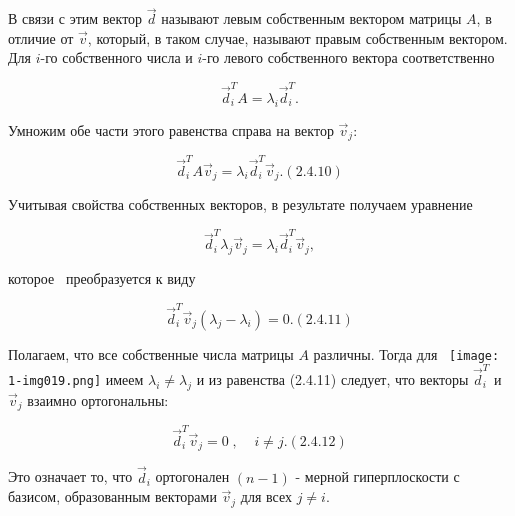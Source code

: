 		В связи с этим вектор  $\vec d$ называют левым собственным вектором матрицы  $A$, в отличие от  $\vec v$, который, в
		таком случае, называют правым собственным вектором. Для  $i$-го собственного числа и  $i$-го левого собственного
		вектора соответственно



		\begin{equation*}\label{key}
		\vec d_i^TA=\lambda _i\vec d_i^T.
		\end{equation*}



		Умножим обе части этого равенства справа на вектор  $\vec v_j$:



		\begin{equation}\label{key}
		\vec d_i^TA\vec v_j=\lambda _i\vec d_i^T\vec v_j.  (2.4.10)
		\end{equation}



		Учитывая свойства собственных векторов, в результате получаем уравнение



	\begin{equation*}\label{key}
	\vec d_i^T\lambda _j\vec v_j=\lambda _i\vec d_i^T\vec v_j,
	\end{equation*}



		которое \ преобразуется к виду



		\begin{equation}\label{key}
		  \vec d_i^T\vec v_j(\lambda _j-\lambda _i)=0.  (2.4.11)
		\end{equation}



		Полагаем, что все собственные числа матрицы  $A$ различны. Тогда для \ 
		\texttt{[image: 1-img019.png]}  имеем  $\lambda _i\neq \lambda _j$ и из равенства (2.4.11) следует, что
		векторы  $\vec d_i^T$ и  $\vec v_j$ взаимно ортогональны:


\begin{equation}\label{key}
		  \vec d_i^T\vec v_j=0\;,\;\;\;\;i\neq j.  (2.4.12)
\end{equation}



		Это означает то, что  $\vec d_i$ ортогонален  $(n-1)$\textit{ }- мерной гиперплоскости с базисом, образованным векторами
		$\vec v_j$ для всех  $j\neq i$.



